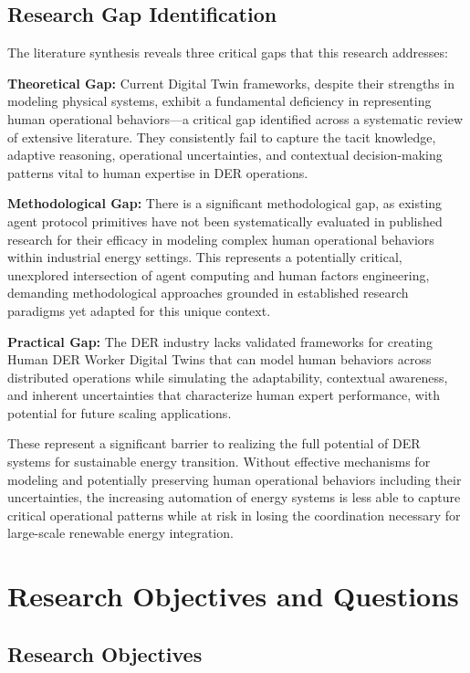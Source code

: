 \documentclass[12pt,a4paper]{article}
\begin{document}
\subsection{Research Gap Identification}

The literature synthesis reveals three critical gaps that this research addresses:

\textbf{Theoretical Gap:} Current Digital Twin frameworks, despite their strengths in modeling physical systems, exhibit a fundamental deficiency in representing human operational behaviors—a critical gap identified across a systematic review of extensive literature. They consistently fail to capture the tacit knowledge, adaptive reasoning, operational uncertainties, and contextual decision-making patterns vital to human expertise in DER operations.

\textbf{Methodological Gap:} There is a significant methodological gap, as existing agent protocol primitives have not been systematically evaluated in published research for their efficacy in modeling complex human operational behaviors within industrial energy settings. This represents a potentially critical, unexplored intersection of agent computing and human factors engineering, demanding methodological approaches grounded in established research paradigms yet adapted for this unique context.

\textbf{Practical Gap:} The DER industry lacks validated frameworks for creating Human DER Worker Digital Twins that can model human behaviors across distributed operations while simulating the adaptability, contextual awareness, and inherent uncertainties that characterize human expert performance, with potential for future scaling applications.

These represent a significant barrier to realizing the full potential of DER systems for sustainable energy transition. Without effective mechanisms for modeling and potentially preserving human operational behaviors including their uncertainties, the increasing automation of energy systems is less able to capture critical operational patterns while at risk in losing the coordination necessary for large-scale renewable energy integration.

\section{Research Objectives and Questions}
\label{sec:objectives}

\subsection{Research Objectives}
\end{document}
